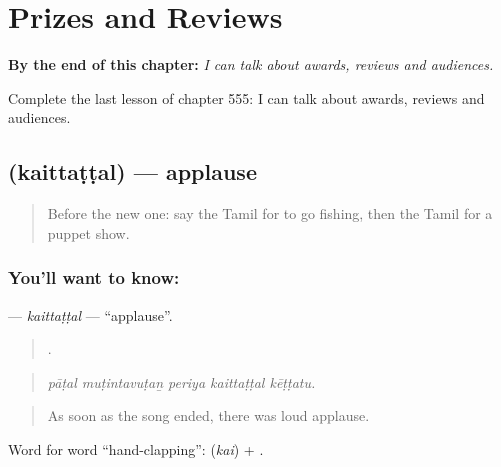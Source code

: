 
\chapter{Prizes and Reviews}
\label{ch:ta-prizes-and-reviews}

\begin{chapteropening}
\textbf{By the end of this chapter:} \emph{I can talk about awards, reviews and audiences.}

Complete the last lesson of chapter 555: I can talk about awards, reviews and audiences.
\end{chapteropening}

\section[\texorpdfstring{\ta{கைத்தட்டல்} (kaittaṭṭal)}{கைத்தட்டல் (kaittaṭṭal)}]{ (kaittaṭṭal) — applause}

\label{lesson:TA-C555-kaittattal}



\begin{quote}
Before the new one: say the Tamil for to go fishing, then the Tamil for a puppet show.
\end{quote}

\subsection*{You'll want to know: }
\textbf{} — \emph{kaittaṭṭal} — \textquotedblleft{}applause\textquotedblright{}.

\begin{quote}
    .
\end{quote}

\begin{quote}
\emph{pāṭal muṭintavuṭaṉ periya kaittaṭṭal kēṭṭatu.}
\end{quote}

\begin{quote}
As soon as the song ended, there was loud applause.
\end{quote}

Word for word \textquotedblleft{}hand-clapping\textquotedblright{}:  (\emph{kai}) + .

